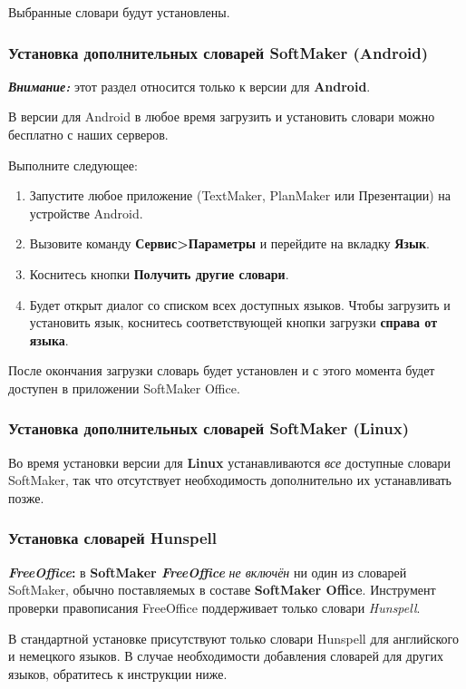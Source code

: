 ﻿\documentclass[a4paper,10pt]{article}
\begin{document}
Выбранные словари будут установлены.

 \subsubsection{Установка дополнительных словарей SoftMaker (Android)}
 \begin{mdframed}[backgroundcolor=blue!10]
\textbf{\textit{Внимание:}} этот раздел относится только к версии для \textbf{Android}.
\end{mdframed}

В версии для Android в любое время загрузить и установить словари можно бесплатно с наших серверов.

Выполните следующее:
\begin{enumerate}
 \item Запустите любое приложение (TextMaker, PlanMaker или Презентации) на устройстве Android.
 \item Вызовите команду \textbf{Сервис>Параметры} и перейдите на вкладку \textbf{Язык}.
 \item Коснитесь кнопки \textbf{Получить другие словари}.
 \item Будет открыт диалог со списком всех доступных языков. Чтобы загрузить и установить язык, коснитесь соответствующей кнопки загрузки \textbf{справа от языка}.
\end{enumerate}

После окончания загрузки словарь будет установлен и с этого момента будет доступен в приложении SoftMaker Office.

 \subsubsection{Установка дополнительных словарей SoftMaker (Linux)}
 Во время установки версии для \textbf{Linux} устанавливаются \textit{все} доступные словари SoftMaker, так что отсутствует необходимость дополнительно их устанавливать позже. 
 
 \subsubsection{Установка словарей Hunspell}
 \begin{mdframed}[backgroundcolor=pink!50]
\textbf{\textit{FreeOffice}:} в \textbf{SoftMaker \textit{FreeOffice}} \textit{не включён} ни один из словарей SoftMaker, обычно поставляемых в составе \textbf{SoftMaker Office}. Инструмент проверки правописания FreeOffice поддерживает только словари \textit{Hunspell}.

В стандартной установке присутствуют только словари Hunspell для английского и немецкого языков. В случае необходимости добавления словарей для других языков, обратитесь к инструкции ниже.
\end{mdframed}
 
\end{document}

